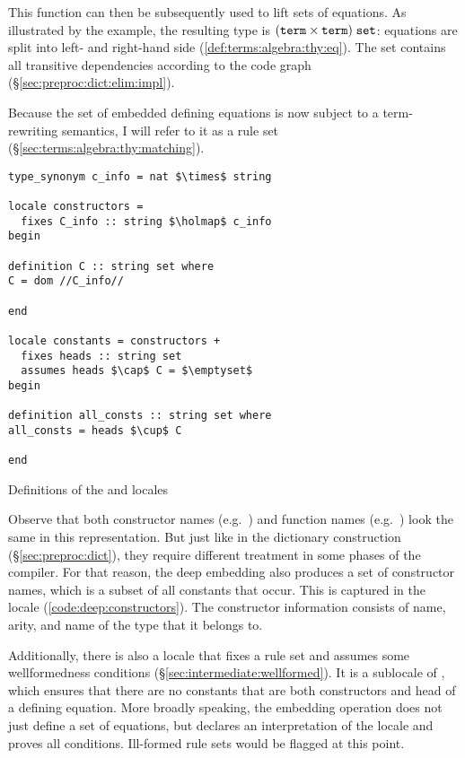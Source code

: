 This function can then be subsequently used to lift sets of equations.
As illustrated by the example, the resulting type is $(\texttt{\textup{term}} \times \texttt{\textup{term}})\;\texttt{\textup{set}}$: equations are split into left- and right-hand side (\cref{def:terms:algebra:thy:eq}).
The set contains all transitive dependencies according to the code graph (§\ref{sec:preproc:dict:elim:impl}).

Because the set of embedded defining equations is now subject to a term-rewriting semantics, I will refer to it as a rule set (§\ref{sec:terms:algebra:thy:matching}).

\begin{code}[t]
  \begin{lstlisting}
type_synonym c_info = nat $\times$ string

locale constructors =
  fixes C_info :: string $\holmap$ c_info
begin

definition C :: string set where
C = dom //C_info//

end

locale constants = constructors +
  fixes heads :: string set
  assumes heads $\cap$ C = $\emptyset$
begin

definition all_consts :: string set where
all_consts = heads $\cup$ C

end\end{lstlisting}
  \caption{Definitions of the  and  locales}
  \label{code:deep:constructors}
\end{code}

Observe that both constructor names (e.g.\ ) and function names (e.g.\ ) look the same in this representation.
But just like in the dictionary construction (§\ref{sec:preproc:dict}), they require different treatment in some phases of the compiler.
For that reason, the deep embedding also produces a set of constructor names, which is a subset of all constants that occur.
This is captured in the  locale (\cref{code:deep:constructors}).
The constructor information consists of name, arity, and name of the type that it belongs to.

Additionally, there is also a locale that fixes a rule set and assumes some wellformedness conditions (§\ref{sec:intermediate:wellformed}).
It is a sublocale of , which ensures that there are no constants that are both constructors and head of a defining equation.
More broadly speaking, the embedding operation does not just define a set of equations, but declares an interpretation of the locale and proves all conditions.
Ill-formed rule sets would be flagged at this point.

